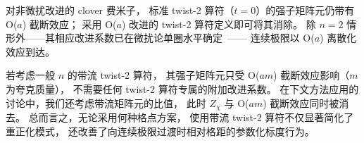 对非微扰改进的 clover 费米子，
标准 twist-2 算符（$t=0$）的强子矩阵元仍带有 O($a$) 截断效应；
采用 O($a$) 改进的 twist-2 算符定义即可将其消除。
除 $n=2$ 情形外——其相应改进系数已在微扰论单圈水平确定~\cite{Capitani:2000xi}——
连续极限以 O($a$) 离散化效应到达。

若考虑一般 $n$ 的带流 twist-2 算符，
其强子矩阵元只受 O($a m$) 截断效应影响（$m$ 为夸克质量），
不需要任何 twist-2 算符专属的附加改进系数。
在下文方法应用的讨论中，我们还考虑带流矩阵元的比值，
此时 $Z_\chi$ 与 O($am$) 截断效应同时被消去。
总而言之，无论采用何种格点方案，
使用带流 twist-2 算符不仅显著简化了重正化模式，
还改善了向连续极限过渡时相对格距的参数化标度行为。
